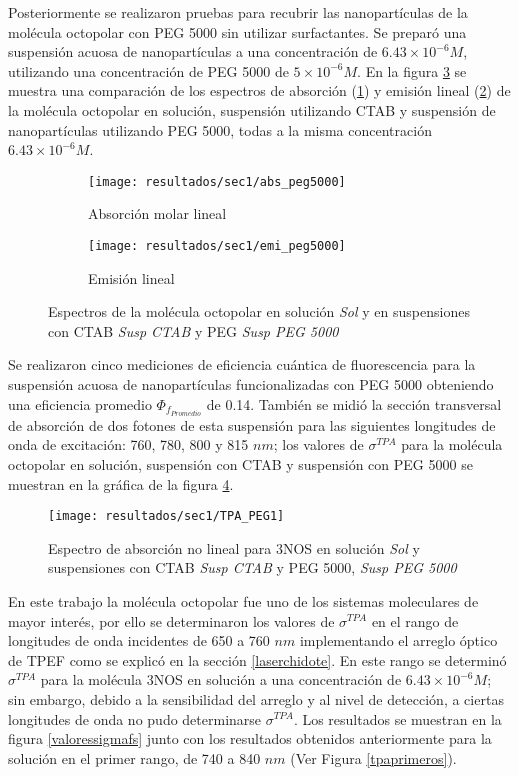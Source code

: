 Posteriormente se realizaron pruebas para recubrir las nanopart\'iculas de la mol\'ecula octopolar con PEG 5000 sin utilizar surfactantes. Se prepar\'o una suspensi\'on acuosa de nanopart\'iculas a una concentraci\'on de $6.43 \times 10^{-6}M$, utilizando una concentraci\'on de PEG 5000 de $5\times 10^{-6} M$. En la figura \ref{grr} se muestra una comparaci\'on de los espectros de absorci\'on (\ref{abspeg1}) y emisi\'on lineal (\ref{emipeg1}) de la mol\'ecula octopolar en soluci\'on, suspensi\'on utilizando CTAB y suspensi\'on de nanopart\'iculas utilizando PEG 5000, todas a la misma concentraci\'on $6.43 \times 10^{-6}M$. 

\begin{figure}
\centering
\begin{subfigure}{0.5\textwidth}
\centering
\texttt{[image: resultados/sec1/abs\_peg5000]}
\caption{Absorci\'on molar lineal }\label{abspeg1}
\end{subfigure}
\begin{subfigure}{0.49\textwidth}
\centering
\texttt{[image: resultados/sec1/emi\_peg5000]}
\caption{Emisi\'on lineal }\label{emipeg1}
\end{subfigure}
\caption{Espectros de la mol\'ecula octopolar en soluci\'on \emph{Sol} y  en suspensiones con CTAB \emph{Susp CTAB} y PEG \emph{Susp PEG 5000}}
\label{grr}
\end{figure}

Se realizaron cinco mediciones de eficiencia cu\'antica de fluorescencia para la suspensi\'on acuosa de nanopart\'iculas funcionalizadas con PEG 5000 obteniendo una eficiencia promedio $\Phi_{f_{Promedio}}$ de 0.14. Tambi\'en se midi\'o la secci\'on transversal de absorci\'on de dos fotones de esta suspensi\'on para las siguientes longitudes de onda de excitaci\'on: 760, 780, 800 y 815 $nm$; los valores de $\sigma^{TPA}$ para la mol\'ecula octopolar en soluci\'on, suspensi\'on con CTAB y suspensi\'on con PEG 5000 se muestran en la gr\'afica de la figura \ref{valoressigmapeg1}.

\begin{figure}[h]
\centering
\texttt{[image: resultados/sec1/TPA\_PEG1]}
\caption{Espectro de absorci\'on no lineal para 3NOS en soluci\'on \emph{Sol} y suspensiones con CTAB \emph{Susp CTAB} y PEG 5000, \emph{Susp PEG 5000}}\label{valoressigmapeg1}
\end{figure}

En este trabajo la mol\'ecula octopolar fue uno de los sistemas moleculares  de mayor inter\'es, por ello se determinaron los valores de $\sigma^{TPA}$ en el rango de longitudes de onda incidentes de 650 a 760 $nm$ implementando el arreglo \'optico de TPEF como se explic\'o en la secci\'on \ref{laserchidote}. En este rango se determin\'o $\sigma^{TPA}$ para la mol\'ecula 3NOS en soluci\'on a una concentraci\'on de $6.43 \times 10^{-6} M$; sin embargo, debido a la sensibilidad del arreglo y al nivel de detecci\'on, a ciertas longitudes de onda no pudo determinarse $\sigma^{TPA}$. Los resultados se muestran en la figura \ref{valoressigmafs} junto con los resultados obtenidos anteriormente para la soluci\'on en el primer rango, de 740 a 840 $nm$ (Ver Figura \ref{tpaprimeros}).

